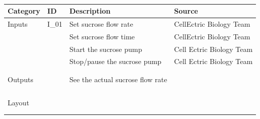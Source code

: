 \documentclass[11pt, a4paper]{report}
\begin{document}
\pagestyle{plain} %

\clearpage
{} %

\begin{table}[]
    \centering
    \caption{}
    \label{tab:my-table}
    \begin{tabular}{|l|l|l|l|}
        \hline
        Category & ID    & Description                      & Source                   \\ \hline
        Inputs   & I\_01 & Set sucrose flow rate            & CellEctric Biology Team  \\
                 &       & Set sucrose flow time            & CellEctric Biology Team  \\
                 &       & Start the sucrose pump           & Cell Ectric Biology Team \\
                 &       & Stop/pause the sucrose pump      & Cell Ectric Biology Team \\
                 &       &                                  &                          \\
                 &       &                                  &                          \\ \hline
        Outputs  &       & See the actual sucrose flow rate &                          \\
                 &       &                                  &                          \\
                 &       &                                  &                          \\
                 &       &                                  &                          \\
                 &       &                                  &                          \\ \hline
        Layout   &       &                                  &                          \\
                 &       &                                  &                          \\
                 &       &                                  &                          \\ \hline
    \end{tabular}
\end{table}
\end{document}
